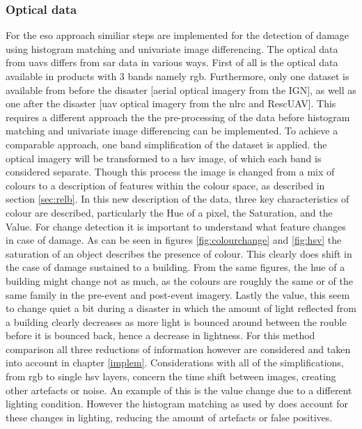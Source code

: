 \subsubsection*{Optical data} 
For the \ac{eso} approach similiar steps are implemented for the detection of damage using histogram matching and univariate image differencing. The optical data from \ac{uav}s differs from \ac{sar} data in various ways. First of all is the optical data available in products with 3 bands namely \ac{rgb}. Furthermore, only one dataset is available from before the disaster [aerial optical imagery from the IGN], as well as one after the disaster [\ac{uav} optical imagery from the \ac{nlrc} and RescUAV]. This requires a different approach the the pre-processing of the data before histogram matching and univariate image differencing can be implemented. To achieve a comparable approach, one band simplification of the dataset is applied. the optical imagery will be transformed to a \ac{hsv} image, of which each band is considered separate. Though this process the image is changed from a mix of colours to a description of features within the colour space, as described in section \ref{sec:relb}. In this new description of the data, three key characteristics of colour are described, particularly the Hue of a pixel, the Saturation, and the Value. For change detection it is important to understand what feature changes in case of damage. As can be seen in figures \ref{fig:colourchange} and \ref{fig:hsv} the saturation of an object describes the presence of colour. This clearly does shift in the case of damage sustained to a building. From the same figures, the hue of a building might change not as much, as the colours are roughly the same or of the same family in the pre-event and post-event imagery. Lastly the value, this seem to change quiet a bit during a disaster in which the amount of light reflected from a building clearly decreases as more light is bounced around between the rouble before it is bounced back, hence a decrease in lightness. For this method comparison all three reductions of information however are considered and taken into account in chapter \ref{implem}. Considerations with all of the simplifications, from \ac{rgb} to single \ac{hsv} layers, concern the time shift between images, creating other artefacts or noise. An example of this is the value change due to a different lighting condition. However the histogram matching as used by \citet{Yun2015} does account for these changes in lighting, reducing the amount of artefacts or false positives. \\

